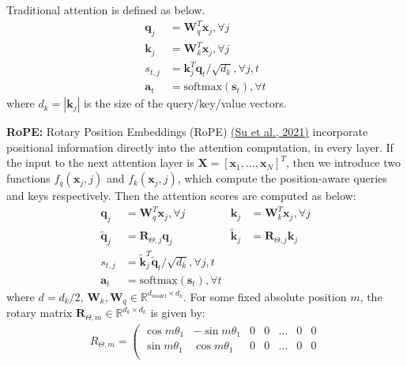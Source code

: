 \documentclass[11pt,addpoints,answers]{exam}
\newcommand{\Rb}{\mathbb{R}}
\newcommand{\av}{\mathbf{a}}
\newcommand{\kv}{\mathbf{k}}
\newcommand{\qv}{\mathbf{q}}
\newcommand{\sv}{\mathbf{s}}
\newcommand{\xv}{\mathbf{x}}
\newcommand{\Rv}{\mathbf{R}}
\newcommand{\Wv}{\mathbf{W}}
\newcommand{\Xv}{\mathbf{X}}
\begin{document}
\begin{questions}
    Traditional attention is defined as below.
    \begin{align*}
        \qv_j &= \Wv_q^T \xv_j, \forall j \\
        \kv_j &= \Wv_k^T \xv_j, \forall j \\
        s_{t,j} &= \kv_j^T \qv_t / \sqrt{d_k}, \forall j,t\\
        \av_t &= \text{softmax}(\sv_t), \forall t
    \end{align*}
    where $d_k = |\kv_j|$ is the size of the query/key/value vectors.

    \textbf{RoPE:}
    Rotary Position Embeddings (RoPE) \href{https://arxiv.org/pdf/2104.09864.pdf}{(Su et al., 2021)} incorporate positional information directly into the attention computation, in every layer. If the input to the next attention layer is $\Xv = [\xv_1, \ldots, \xv_N]^T$, then we introduce two functions $f_q(\xv_j, j)$ and $f_k(\xv_j, j)$, which compute the position-aware queries and keys respectively. Then the attention scores are computed as below:
    \renewcommand{\tilde}{\widetilde}
    \begin{align*}
        \qv_j &= \Wv_q^T \xv_j, \forall j 
        & \kv_j &= \Wv_k^T \xv_j, \forall j \\
        \tilde{\qv}_j &= \Rv_{\Theta,j} \qv_j
        & \tilde{\kv}_j &= \Rv_{\Theta,j} \kv_j \\
        s_{t,j} &= \tilde{\kv}_j^T \tilde{\qv}_t / \sqrt{d_k}, \forall j,t\\
        \av_t &= \text{softmax}(\sv_t), \forall t
    \end{align*}
    where $d = d_k / 2$, $\Wv_k, \Wv_q \in \Rb^{d_{model} \times d_k}$. For some fixed absolute position $m$, the rotary matrix $\Rv_{\Theta,m} \in \Rb^{d_k \times d_k}$ is given by:
    \begin{align*}
        R_{\Theta,m} =
        \left(
        \begin{array}{ccccccc}
        \cos m\theta_1 & -\sin m\theta_1 & 0 & 0 & \dots & 0 & 0  \\
        \sin m\theta_1 & \cos m\theta_1 & 0 & 0 & \dots & 0 & 0 \\

\end{array}
\end{align*}
\end{questions}
\end{document}
